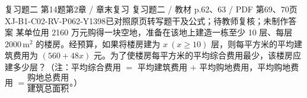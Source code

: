 \par\noindent\begin{minipage}{\linewidth}
\begin{bankitem}{复习题二 第14题}{第2章 / 章末复习 复习题二 / 教材 p.62、63 / PDF 第69、70页}{XJ-B1-C02-RV-P062-Y1398}{已对照原页转写题干及公式；待教师复核；未制作答案}
某单位用 2160 万元购得一块空地，准备在该地上建造一栋至少 10 层、每层 $2000\,\mathrm{m^2}$ 的楼房。经预算，如果将楼房建为 $x\ (x\ge10)$ 层，则每平方米的平均建筑费用为 $(560+48x)$ 元。为了使楼房每平方米的平均综合费用最少，该楼房应建多少层？（注：平均综合费用 $=$ 平均建筑费用 $+$ 平均购地费用，平均购地费用 $=\dfrac{\text{购地总费用}}{\text{建筑总面积}}$。）
\end{bankitem}
\end{minipage}\par\medskip
